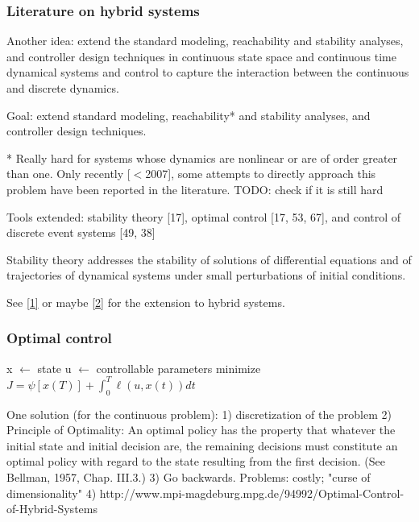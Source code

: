 \documentclass{beamer}
\begin{document}
\begin{frame}
	\frametitle{Literature on hybrid systems}
	 Another idea:  extend the standard modeling, reachability and stability
analyses, and controller design techniques in continuous state space and continuous time dynamical systems and control to capture the interaction between the continuous
and discrete dynamics. \newline

Goal: extend standard modeling, reachability* and stability analyses, and controller design techniques. \newline

* Really hard for systems whose dynamics are nonlinear or are of order greater than one.  Only recently [$<$2007], some attempts to directly
approach this problem have been reported in the literature. TODO: check if it is still hard \newline


Tools extended:  stability theory [17], optimal control [17, 53, 67], and control of discrete event systems [49, 38] \newline


\end{frame}

\begin{frame}
	Stability theory addresses the stability of solutions of differential equations and of trajectories of dynamical systems under small perturbations of initial conditions. \newline
	
	
	See \href{<http://www.mit.edu/people/mitter/SKM_theses/95_6_Branicky_DSc.pdf>}{[1]} or maybe \href{<http://ieeexplore.ieee.org/stamp/stamp.jsp?arnumber=664149>}{[2]} for the extension to hybrid systems.
\end{frame}

\begin{frame}
	\frametitle{Optimal control}
	x $\leftarrow$ state \newline
	u $\leftarrow$ controllable parameters \newline
	minimize 	$J = \psi[x(T)] + \int_{0}^{T} \ell(u,x(t)) dt$
	
\end{frame}

\begin{frame}
	One solution (for the continuous problem):
	1) discretization of the problem
	2) Principle of Optimality: An optimal policy has the property that whatever the initial state and initial decision are, the remaining decisions must constitute an optimal policy with regard to the state resulting from the first decision. (See Bellman, 1957, Chap. III.3.)
	3) Go backwards.
	Problems: costly; "curse of dimensionality"
	4) http://www.mpi-magdeburg.mpg.de/94992/Optimal-Control-of-Hybrid-Systems
\end{frame}
\end{document}
